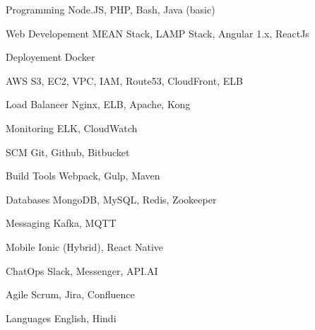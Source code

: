 

\begin{cvskills}


\cvskill
{Programming} %
{Node.JS, PHP, Bash, Java (basic)} %


\cvskill
{Web Developement} %
{MEAN Stack, LAMP Stack, Angular 1.x, ReactJs} %

\cvskill
{Deployement} %
{Docker} %

\cvskill
{AWS} %
{S3, EC2, VPC, IAM, Route53, CloudFront, ELB} %

\cvskill
{Load Balancer} %
{Nginx, ELB, Apache, Kong} %

\cvskill
{Monitoring} %
{ELK, CloudWatch} %

\cvskill
{SCM} %
{Git, Github, Bitbucket} %

\cvskill
{Build Tools} %
{Webpack, Gulp, Maven} %


\cvskill
{Databases} %
{MongoDB, MySQL, Redis, Zookeeper} %

\cvskill
{Messaging} %
{Kafka, MQTT} %

\cvskill
{Mobile} %
{Ionic (Hybrid), React Native} %

\cvskill
{ChatOps} %
{Slack, Messenger, API.AI} %

\cvskill
{Agile} %
{Scrum, Jira, Confluence} %


\cvskill
{Languages} %
{English, Hindi} %


\end{cvskills}
